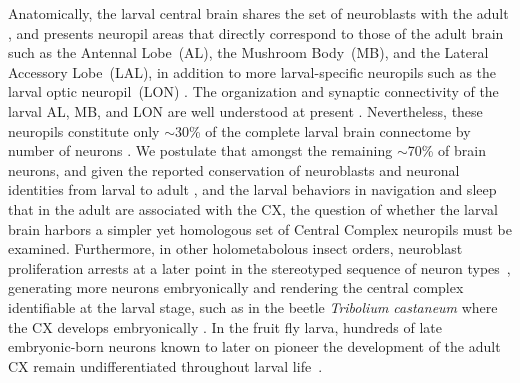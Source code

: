     Anatomically, the larval central brain shares the set of neuroblasts with the adult \citep{lacin2016lineage}, and presents neuropil areas that directly correspond to those of the adult brain such as the Antennal Lobe~(AL), the Mushroom Body~(MB), and the Lateral Accessory Lobe~(LAL), in addition to more larval-specific neuropils such as the larval optic neuropil~(LON) \citep{pereanu2010neuropildev}.
    The organization and synaptic connectivity of the larval AL, MB, and LON are well understood at present \citep{berck2016wiring, eichler2017complete, larderet2017opticlobe}.
    Nevertheless, these neuropils constitute only $\sim$30\% of the complete larval brain connectome by number of neurons \citep{winding2023connectome}.
    We postulate that amongst the remaining $\sim$70\% of brain neurons, and given the reported conservation of neuroblasts \citep{lacin2016lineage} and neuronal identities from larval to adult \citep{truman2023metamorphosis}, and the larval behaviors in navigation and sleep that in the adult are associated with the CX, the question of whether the larval brain harbors a simpler yet homologous set of Central Complex neuropils must be examined.
    Furthermore, in other holometabolous insect orders, neuroblast proliferation arrests at a later point in the stereotyped sequence of neuron types~\citep{truman1999origins}, generating more neurons embryonically and rendering the central complex identifiable at the larval stage, such as in the beetle \textit{Tribolium castaneum} where the CX develops embryonically \citep{koniszewski2016TriboliumCX, farnworth2020TriboliumCXvsFly}.
    In the fruit fly larva, hundreds of late embryonic-born neurons known to later on pioneer the development of the adult CX remain undifferentiated throughout larval life~\citep{andrade2019developmentally}.

